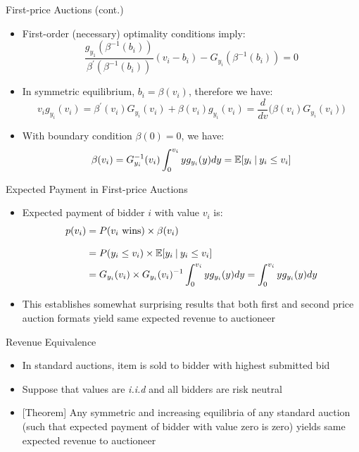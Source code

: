 \documentclass[11pt,aspectratio=169]{beamer}
\begin{document}
  \begin{frame}{First-price Auctions (cont.)}
   \begin{itemize}
    \item First-order (necessary) \alert{optimality conditions} imply\footnotemark{}:
    $$\frac{g_{y_1}(\beta^{-1}(b_i))}{\beta^\prime(\beta^{-1}(b_i))}(v_i-b_i)-G_{y_i}(\beta^{-1}(b_i))=0$$
    \item In symmetric equilibrium, $b_i = \beta (v_i)$, therefore we have:
     \begin{equation*}
      v_i g_{y_i}(v_i)=\beta^\prime(v_i)G_{y_i}(v_i)+\beta(v_i)g_{y_i}(v_i)=\frac{d}{dv}\big(\beta(v_i)G_{y_i}(v_i)\big)
     \end{equation*}
    \item With \alert{boundary condition} $\beta(0)=0$, we have: 
     \begin{equation*}
      \beta(v_i) = G_{y_i}^{-1}(v_i)\int_0^{v_i}yg_{y_i}(y)dy=\mathbb{E}[y_i \:\vert\: y_i\le v_i]
     \end{equation*}
   \end{itemize}
  \end{frame}
  
  
  \begin{frame}{Expected Payment in First-price Auctions}
   \begin{itemize}
    \item Expected payment of bidder $i$ with value $v_i$ is:
     \begin{align*}
      p(v_i)&=P(v_i\text{ wins})\times \beta(v_i)\\[0.8em]
      &=P(y_i\le v_i)\times \mathbb{E}[y_i\:\vert\: y_i\le v_i]\\
      &=G_{y_i}(v_i)\times G_{y_i}(v_i)^{-1}\int_0^{v_i}yg_{y_i}(y)dy =\int_0^{v_i}yg_{y_i}(y)dy
     \end{align*}
    \item This establishes somewhat surprising results that both first and second price auction formats yield \alert{same expected revenue} to auctioneer
   \end{itemize}
  \end{frame}
  
  
  \begin{frame}{Revenue Equivalence}
   \begin{itemize}[<+->]
   \setlength{\itemsep}{1.2em}
    \item In \alert{standard auctions}, item is sold to bidder with highest submitted bid
    \item Suppose that values are \textit{i.i.d} and all bidders are risk neutral
    \item \alert{[Theorem]} Any symmetric and increasing equilibria of any standard auction (such that expected payment of bidder with value zero is zero) yields same expected revenue to auctioneer  
   \end{itemize}
  \end{frame}
  
\end{document}
